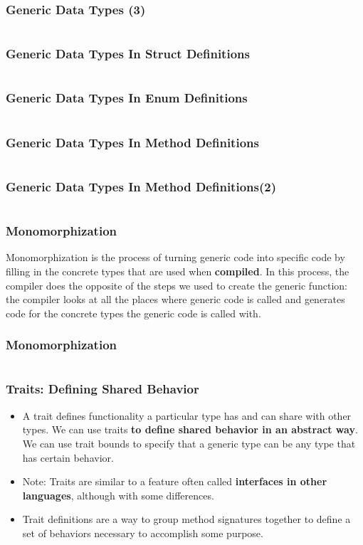 \documentclass{beamer}
\begin{document}
\begin{frame}[fragile]
	\frametitle{Generic Data Types (3)}
	\inputminted[fontsize=\scriptsize]{rust}{./code/generic3.rs}
\end{frame}

\begin{frame}[fragile]
	\frametitle{Generic Data Types In Struct Definitions}
	\inputminted{rust}{./code/generic4.rs}
\end{frame}

\begin{frame}[fragile]
	\frametitle{Generic Data Types In Enum Definitions}
	\inputminted{rust}{./code/generic5.rs}
\end{frame}


\begin{frame}[fragile]
	\frametitle{Generic Data Types In Method Definitions}
	\inputminted[fontsize=\scriptsize]{rust}{./code/generic6.rs}
\end{frame}

\begin{frame}[fragile]
	\frametitle{Generic Data Types In Method Definitions(2)}
	\inputminted[fontsize=\scriptsize]{rust}{./code/generic7.rs}
\end{frame}


\begin{frame}[fragile]
	\frametitle{Monomorphization}
	Monomorphization is the process of turning generic code into specific code by filling in the concrete types that are used when \textbf{compiled}. In this process, the compiler does the opposite of the steps we used to create the generic function: the compiler looks at all the places where generic code is called and generates code for the concrete types the generic code is called with.
	
\end{frame}

\begin{frame}[fragile]
	\frametitle{Monomorphization}
	
	\inputminted[fontsize=\scriptsize]{rust}{./code/generic8.rs}
\end{frame}


\begin{frame}[fragile]
	\frametitle{Traits: Defining Shared Behavior}
	\begin{itemize}
		\item A trait defines functionality a particular type has and can share with other types. We can use traits \textbf{to define shared behavior in an abstract way}. We can use trait bounds to specify that a generic type can be any type that has certain behavior.
		\item 	Note: Traits are similar to a feature often called \textbf{interfaces in other languages}, although with some differences.
		\item 	Trait definitions are a way to group method signatures together to define a set of behaviors necessary to accomplish some purpose.
	\end{itemize}
\end{frame}
\end{document}
